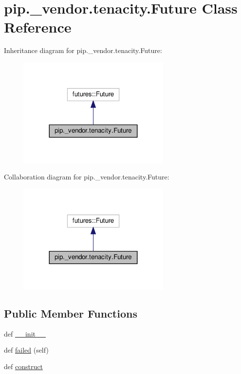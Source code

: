 \hypertarget{classpip_1_1__vendor_1_1tenacity_1_1Future}{}\section{pip.\+\_\+vendor.\+tenacity.\+Future Class Reference}
\label{classpip_1_1__vendor_1_1tenacity_1_1Future}


Inheritance diagram for pip.\+\_\+vendor.\+tenacity.\+Future\+:
\nopagebreak
\begin{figure}[H]
\begin{center}
\leavevmode
\includegraphics[width=215pt]{classpip_1_1__vendor_1_1tenacity_1_1Future__inherit__graph}
\end{center}
\end{figure}


Collaboration diagram for pip.\+\_\+vendor.\+tenacity.\+Future\+:
\nopagebreak
\begin{figure}[H]
\begin{center}
\leavevmode
\includegraphics[width=215pt]{classpip_1_1__vendor_1_1tenacity_1_1Future__coll__graph}
\end{center}
\end{figure}
\subsection*{Public Member Functions}
\begin{DoxyCompactItemize}
\item 
def \hyperlink{classpip_1_1__vendor_1_1tenacity_1_1Future_a04084a63bbc75df29227ac834bf93bea}{\+\_\+\+\_\+init\+\_\+\+\_\+}
\item 
def \hyperlink{classpip_1_1__vendor_1_1tenacity_1_1Future_a17330f1fdf2e49a7f8be503e56588856}{failed} (self)
\item 
def \hyperlink{classpip_1_1__vendor_1_1tenacity_1_1Future_aa9bf7b4df4838f47bafcaef40fa29b1c}{construct}
\end{DoxyCompactItemize}
